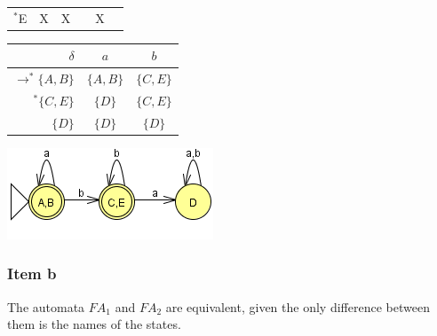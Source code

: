 {\begin{center}
\begin{tabular}{r || c | c | c | c | c}
	$^*$E  & X  & X  &    & X  & \cellcolor{gray}
\end{tabular} \end{center}
\begin{center}
\begin{minipage}[c]{0.40\textwidth}
\begin{center} \begin{tabular}{r | c c}
	$\delta                $ & $a      $ & $b      $ \\ \hline
	$\rightarrow ^* \{A,B\}$ & $\{A,B\}$ & $\{C,E\}$ \\
	$            ^* \{C,E\}$ & $\{D  \}$ & $\{C,E\}$ \\
	$               \{D  \}$ & $\{D  \}$ & $\{D  \}$
\end{tabular} \end{center}
\end{minipage}%
\begin{minipage}[c]{0.35\textwidth}
\begin{center} \includegraphics[scale=0.5]{TP07_6a} \end{center}
\end{minipage}
\end{center}
\subsubsection{Item b}
The automata $FA_1$ and $FA_2$ are equivalent, given the only difference between them is the names of the states.
}
